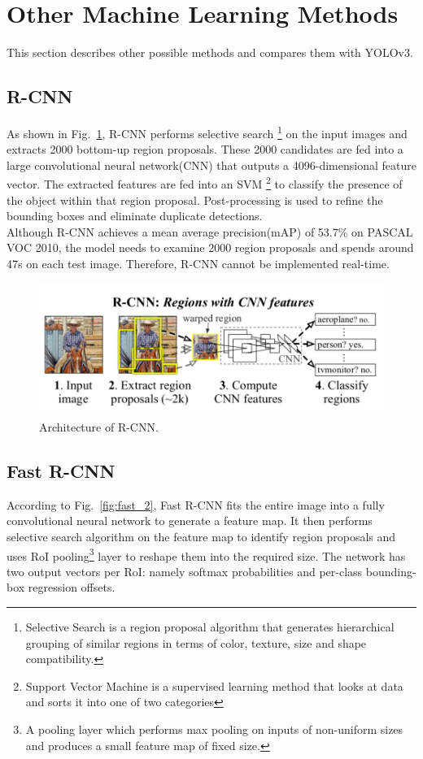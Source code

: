 \documentclass[letterpaper]{article} %
\begin{document}
\section{Other Machine Learning Methods}
This section describes other possible methods and compares them with YOLOv3.

\subsection{R-CNN}
As shown in Fig.~\ref{fig:r_cnn}, R-CNN performs selective search \footnote{Selective Search is a region proposal algorithm that generates hierarchical grouping of similar regions in terms of color, texture, size and shape compatibility.} on the input images and extracts 2000 bottom-up region proposals. These 2000 candidates are fed into a large convolutional neural network(CNN) that outputs a 4096-dimensional feature vector. The extracted features are fed into an SVM \footnote{Support Vector Machine is a supervised learning method that looks at data and sorts it into one of two categories} to classify the presence of the object within that region proposal. Post-processing is used to refine the bounding boxes and eliminate duplicate detections.\\

\noindent Although R-CNN achieves a mean average precision(mAP) of 53.7\% on PASCAL VOC 2010, the model needs to examine 2000 region proposals and spends around 47s on each test image. Therefore, R-CNN cannot be implemented real-time.
\begin{figure}[ht]
\hspace{0mm}
\centering
\includegraphics[scale = 0.28]{Figure/r_cnn.png}
\caption{\footnotesize{Architecture of R-CNN.}}
\label{fig:r_cnn}
\vspace{0mm}
\end{figure}
\subsection{Fast R-CNN}
According to Fig.~\ref{fig:fast_2}, Fast R-CNN fits the entire image into a fully convolutional neural network to generate a feature map. It then performs selective search algorithm on the feature map to identify region proposals and uses RoI pooling\footnote{A pooling layer which performs max pooling on inputs of non-uniform sizes and produces a small feature map of fixed size.} layer to reshape them into the required size. The network has two output vectors per RoI: namely softmax probabilities and per-class bounding-box regression offsets.\\
\end{document}
